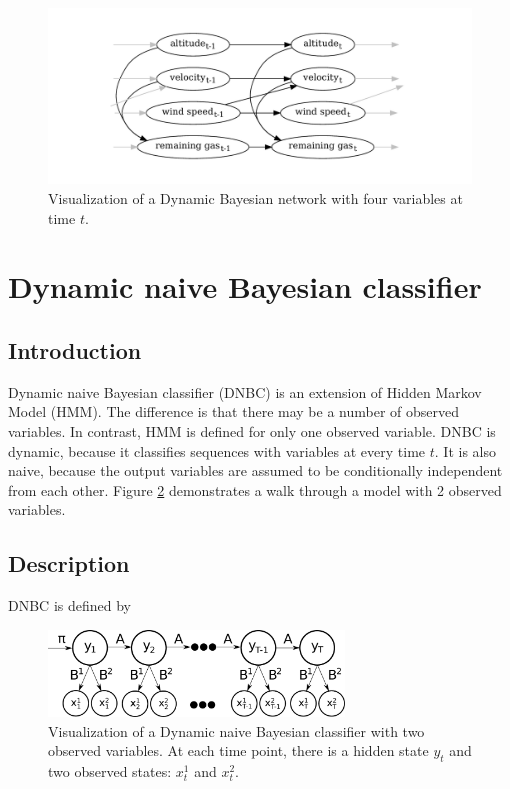 \documentclass[thesis=B,english]{FITthesis}[2012/06/26]
\begin{document}
\begin{figure}
	\centering
 	\includegraphics[width=1\textwidth]{dbn}
 	\caption{Visualization of a Dynamic Bayesian network with four variables at time $t$.}
 	\label{fig:dbn}
\end{figure}

\section{Dynamic naive Bayesian classifier}

\subsection{Introduction}

Dynamic naive Bayesian classifier (DNBC) is an extension of Hidden Markov Model (HMM). The difference is that there may be a number of observed variables. In contrast, HMM is defined for only one observed variable. DNBC is dynamic, because it classifies sequences with variables at every time $t$. It is also naive, because the output variables are assumed to be conditionally independent from each other. Figure \ref{fig:dnbc} demonstrates a walk through a model with 2 observed variables. 

\subsection{Description}

DNBC is defined by

\begin{figure}
	\centering
 	\includegraphics[width=0.7\textwidth]{dnbc}
 	\caption{Visualization of a Dynamic naive Bayesian classifier with two observed variables. At each time point, there is a hidden state $y_t$ and two observed states: $x_t^1$ and $x_t^2$.}
 	\label{fig:dnbc}
\end{figure}
\end{document}

